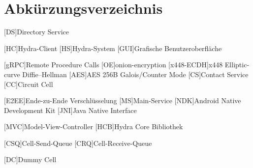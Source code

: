 \section{Abkürzungsverzeichnis}

\begin{acronym}
[DS]{Directory Service}

[HC]{Hydra-Client}
[HS]{Hydra-System}
[GUI]{Grafische Benutzeroberfläche}

[gRPC]{Remote Procedure Calls}
[OE]{onion-encryption}
[x448-ECDH]{x448 Elliptic-curve Diffie–Hellman}
[AES]{AES 256B Galois/Counter Mode}
[CS]{Contact Service}
[CC]{Circuit Cell}

[E2EE]{Ende-zu-Ende Verschlüsselung}
[MS]{Main-Service}
[NDK]{Android Native Development Kit}
[JNI]{Java Native Interface}

[MVC]{Model-View-Controller}
[HCB]{Hydra Core Bibliothek}

[CSQ]{Cell-Send-Queue}
[CRQ]{Cell-Receive-Queue}

[DC]{Dummy Cell}

\end{acronym}